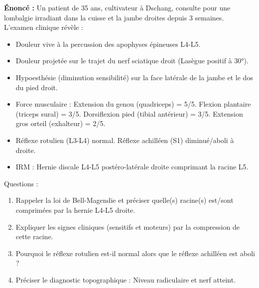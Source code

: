 \documentclass[11pt]{article}
\begin{document}
\begin{exoresolu}
\textbf{Énoncé :} Un patient de 35 ans, cultivateur à Dschang, consulte pour une lombalgie irradiant dans la cuisse et la jambe droites depuis 3 semaines. L'examen clinique révèle :
\begin{itemize}
    \item Douleur vive à la percussion des apophyses épineuses L4-L5.
    \item Douleur projetée sur le trajet du nerf sciatique droit (Lasègue positif à 30°).
    \item Hypoesthésie (diminution sensibilité) sur la face latérale de la jambe et le dos du pied droit.
    \item Force musculaire : Extension du genou (quadriceps) = 5/5. Flexion plantaire (triceps sural) = 3/5. Dorsiflexion pied (tibial antérieur) = 3/5. Extension gros orteil (exhalteur) = 2/5.
    \item Réflexe rotulien (L3-L4) normal. Réflexe achilléen (S1) diminué/aboli à droite.
    \item IRM : Hernie discale L4-L5 postéro-latérale droite comprimant la racine L5.
\end{itemize}
Questions :
\begin{enumerate}
    \item Rappeler la loi de Bell-Magendie et préciser quelle(s) racine(s) est/sont comprimées par la hernie L4-L5 droite.
    \item Expliquer les signes cliniques (sensitifs et moteurs) par la compression de cette racine.
    \item Pourquoi le réflexe rotulien est-il normal alors que le réflexe achilléen est aboli ?
    \item Préciser le diagnostic topographique : Niveau radiculaire et nerf atteint.
\end{enumerate}


\end{exoresolu}
\end{document}
